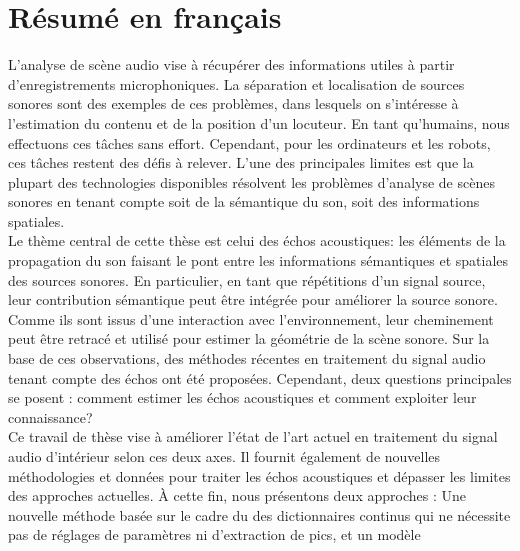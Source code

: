 \chapter*{Résumé en français}


    L'analyse
     de scène audio vise à récupérer des informations utiles à partir d'enregistrements microphoniques.
    La séparation et localisation de sources sonores sont des exemples de ces problèmes, dans lesquels on s'intéresse à l'estimation du contenu et de la position d'un locuteur.
    En tant qu'humains, nous effectuons ces tâches sans effort.
    Cependant, pour les ordinateurs et les robots, ces tâches restent des défis à relever.
    L'une des principales limites est que la plupart des technologies disponibles résolvent les problèmes d'analyse de scènes sonores en tenant compte soit de la sémantique du son, soit des informations spatiales.
    \\Le thème central de cette thèse est celui des échos acoustiques: les éléments de la propagation du son faisant le pont entre les informations sémantiques et spatiales des sources sonores.
    En particulier, en tant que répétitions d'un signal source, leur contribution sémantique peut être intégrée pour améliorer la source sonore.
    Comme ils sont issus d'une interaction avec l'environnement, leur cheminement peut être retracé et utilisé pour estimer la géométrie de la scène sonore.
    Sur la base de ces observations, des méthodes récentes en traitement du signal audio tenant compte des échos ont été proposées.
    Cependant, deux questions principales se posent : comment estimer les échos acoustiques et comment exploiter leur connaissance?
    \\Ce travail de thèse vise à améliorer l'état de l'art actuel en traitement du signal audio d'intérieur selon ces deux axes.
    Il fournit également de nouvelles méthodologies et données pour traiter les échos acoustiques et dépasser les limites des approches actuelles.
    À cette fin, nous présentons deux approches :
    Une nouvelle méthode basée sur le cadre du des dictionnaires continus qui ne nécessite pas de réglages de paramètres ni d'extraction de pics, et un modèle
